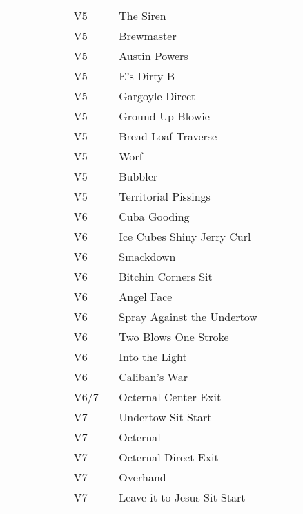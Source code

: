 \begin{flushleft}
\begin{center}
\begin{supertabular}{p{0.18\linewidth}p{0.13\linewidth}p{0.45\linewidth}p{0.08\linewidth}}
   &V5&The Siren & \pageref{rt:The Siren} \\
  &V5&Brewmaster & \pageref{rt:Brewmaster} \\
  &V5&Austin Powers & \pageref{rt:Austin Powers} \\
  &V5&E's Dirty B & \pageref{rt:E's Dirty B} \\
  &V5&Gargoyle Direct & \pageref{vr:Gargoyle Direct} \\
  &V5&Ground Up Blowie & \pageref{rt:Ground Up Blowie} \\
  &V5&Bread Loaf Traverse & \pageref{rt:Bread Loaf Traverse} \\
  &V5&Worf & \pageref{rt:Worf} \\
&V5&Bubbler & \pageref{rt:Bubbler} \\
&V5&Territorial Pissings & \pageref{rt:Territorial Pissings} \\
  &V6&Cuba Gooding & \pageref{rt:Cuba Gooding} \\
  &V6&Ice Cubes Shiny Jerry Curl & \pageref{rt:Ice Cubes Shiny Jerry Curl} \\
  &V6&Smackdown & \pageref{rt:Smackdown} \\
  &V6&Bitchin Corners Sit & \pageref{vr:Bitchin Corners Sit} \\
&V6&Angel Face & \pageref{rt:Angel Face} \\
&V6&Spray Against the Undertow & \pageref{vr:Spray Against the Undertow} \\
&V6&Two Blows One Stroke & \pageref{rt:Two Blows One Stroke} \\
&V6&Into the Light & \pageref{rt:Into the Light} \\
&V6&Caliban's War & \pageref{rt:Caliban's War} \\
  &V6/7&Octernal Center Exit & \pageref{vr:Octernal Center Exit} \\
   &V7&Undertow Sit Start & \pageref{vr:Undertow Sit Start} \\
   &V7&Octernal & \pageref{rt:Octernal} \\
   &V7&Octernal Direct Exit & \pageref{vr:Octernal Direct Exit} \\
&V7&Overhand & \pageref{rt:Overhand} \\
&V7&Leave it to Jesus Sit Start & \pageref{vr:Leave it to Jesus Sit Start} \\

\end{supertabular}
\end{center}
\end{flushleft}
